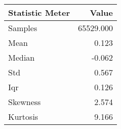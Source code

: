 \begin{tabular}{lr}
\hline
 Statistic Meter   &     Value \\
\hline
 Samples           & 65529.000 \\
 Mean              &     0.123 \\
 Median            &    -0.062 \\
 Std               &     0.567 \\
 Iqr               &     0.126 \\
 Skewness          &     2.574 \\
 Kurtosis          &     9.166 \\
\hline
\end{tabular}
